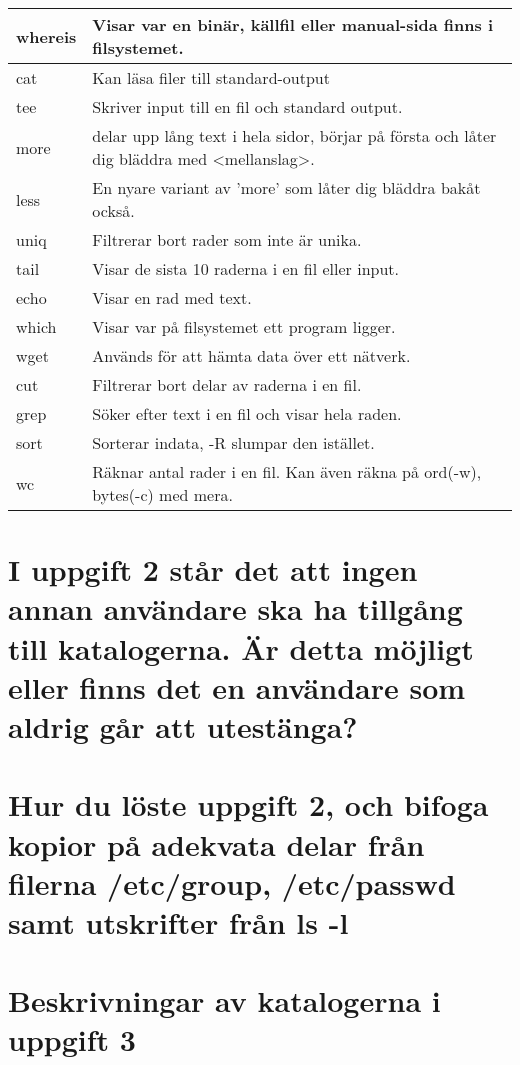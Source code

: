 \documentclass[11pt]{article}
\begin{document}
\begin{center}
\begin{longtable}{ | l | p{10cm} |}
	whereis & Visar var en binär, källfil eller manual-sida finns i filsystemet. \\ \hline	
	cat & Kan läsa filer till standard-output \\ \hline	
	tee & Skriver input till en fil och standard output. \\ \hline	
	more & delar upp lång text i hela sidor, börjar på första och låter dig bläddra med <mellanslag>. \\ \hline	
	less & En nyare variant av 'more' som låter dig bläddra bakåt också.\\ \hline	
	uniq & Filtrerar bort rader som inte är unika. \\ \hline	
	tail & Visar de sista 10 raderna i en fil eller input. \\ \hline	
	echo & Visar en rad med text. \\ \hline	
	which & Visar var på filsystemet ett program ligger. \\ \hline	
	wget & Används för att hämta data över ett nätverk.  \\ \hline	
	cut & Filtrerar bort delar av raderna i en fil.  \\ \hline	
	grep & Söker efter text i en fil och visar hela raden. \\ \hline	
	sort & Sorterar indata, -R slumpar den istället. \\ \hline	
	wc & Räknar antal rader i en fil. Kan även räkna på ord(-w), bytes(-c) med mera.  \\ \hline	    
    \end{longtable}
\end{center}

\section{I uppgift 2 står det att ingen annan användare ska ha tillgång till katalogerna. Är detta möjligt eller finns det en användare som aldrig går att utestänga?}
\lipsum[56]

\section{Hur du löste uppgift 2, och bifoga kopior på adekvata delar från filerna /etc/group, /etc/passwd samt utskrifter från ls -l}
\lipsum[56]
     
\section{Beskrivningar av katalogerna i uppgift 3}
\lipsum[56]
\end{document}

